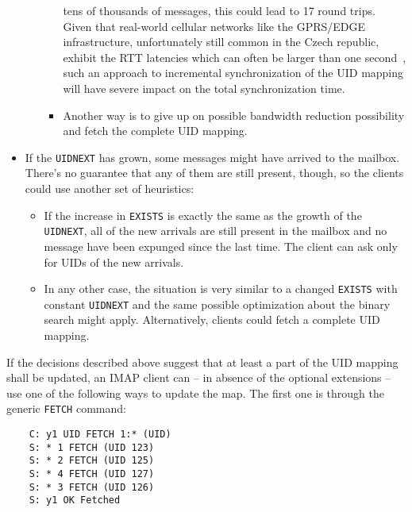 \documentclass[trojita]{subfiles}
\begin{document}
\begin{itemize}
\begin{itemize}
\begin{itemize}
                        tens of thousands of messages, this could lead to 17 round trips.  Given that real-world
                        cellular networks like the GPRS/EDGE infrastructure, unfortunately still common in the Czech
                        republic, exhibit the RTT latencies which can often be larger than one
                        second~\cite{gprs-rtt-report}, such an approach to incremental synchronization of the UID
                        mapping will have severe impact on the total synchronization time.
                    \item Another way is to give up on possible bandwidth reduction possibility and fetch the complete
                        UID mapping.
                \end{itemize}
        \end{itemize}
    \item If the {\tt UIDNEXT} has grown, some messages might have arrived to the mailbox.  There's no guarantee that
        any of them are still present, though, so the clients could use another set of heuristics:
        \begin{itemize}
            \item If the increase in {\tt EXISTS} is exactly the same as the growth of the {\tt UIDNEXT}, all of the new
                arrivals are still present in the mailbox and no message have been expunged since the last time.  The
                client can ask only for UIDs of the new arrivals.
            \item In any other case, the situation is very similar to a changed {\tt EXISTS} with constant {\tt UIDNEXT}
                and the same possible optimization about the binary search might apply.  Alternatively, clients could
                fetch a complete UID mapping.
        \end{itemize}
\end{itemize}

If the decisions described above suggest that at least a part of the UID mapping shall be updated, an IMAP client can --
in absence of the optional extensions -- use one of the following ways to update the map.  The first one is through the
generic {\tt FETCH} command:

\begin{verbatim}
    C: y1 UID FETCH 1:* (UID)
    S: * 1 FETCH (UID 123)
    S: * 2 FETCH (UID 125)
    S: * 4 FETCH (UID 127)
    S: * 3 FETCH (UID 126)
    S: y1 OK Fetched
\end{verbatim}
\end{document}
